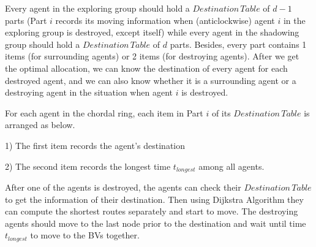 Every agent in the exploring group should hold a $Destination\,Table$ of $d-1$ parts (Part $i$ records its moving information when     (anticlockwise) agent $i$ in the exploring group is destroyed, except itself) while   every agent in the shadowing group should hold a $Destination\,Table$ of $d$ parts.  Besides, every part contains 1 items (for surrounding agents) or 2 items (for destroying agents). 
After we get the optimal allocation, we can know the destination of every agent  for each destroyed agent, and we can also know whether it is a surrounding agent or a destroying agent in the situation when  agent $i$ is destroyed.
 

For each agent in the chordal ring, each item in Part $i$ of its $Destination\,Table$ is arranged as below. 
\begin{description}
\item 1) The first item records the agent's destination
\item 2) The second item records the longest time $t_{longest}$ among all agents.
\end{description}


After one of the agents is destroyed, the agents can check their $Destination\,Table$ to get the information of their destination. Then using Dijkstra Algorithm they can compute the shortest routes separately and start to move. The destroying agents should move to the last node prior to the destination and wait until time $t_{longest}$ to move to the BVs together. 



